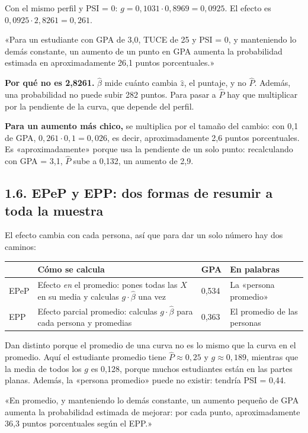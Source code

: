 \documentclass[11pt,letterpaper]{article}
\newcommand{\tema}[1]{\subsection*{#1}}
\newcommand{\Ph}{\hat{P}}
\newcommand{\zh}{\hat{z}}
\begin{document}
Con el mismo perfil y PSI = 0: $g=0{,}1031\cdot0{,}8969=0{,}0925$. El efecto es $0{,}0925\cdot2{,}8261=0{,}261$.

\begin{frase}
«Para un estudiante con GPA de 3,0, TUCE de 25 y PSI = 0, y manteniendo lo demás constante, un aumento de un punto en GPA aumenta la probabilidad estimada en aproximadamente 26,1 puntos porcentuales.»
\end{frase}

\textbf{Por qué no es 2,8261.} $\hat\beta$ mide cuánto cambia $\zh$, el puntaje, y no $\Ph$. Además, una probabilidad no puede subir 282 puntos. Para pasar a $\Ph$ hay que multiplicar por la pendiente de la curva, que depende del perfil.

\textbf{Para un aumento más chico,} se multiplica por el tamaño del cambio: con 0,1 de GPA, $0{,}261\cdot0{,}1=0{,}026$, es decir, aproximadamente 2,6 puntos porcentuales. Es «aproximadamente» porque usa la pendiente de un solo punto: recalculando con GPA = 3,1, $\Ph$ sube a 0,132, un aumento de 2,9.

\tema{1.6. EPeP y EPP: dos formas de resumir a toda la muestra}

El efecto cambia con cada persona, así que para dar un solo número hay dos caminos:

\begin{center}
\begin{tabular}{p{1.1cm}p{6.4cm}p{2.4cm}p{3.5cm}}
\toprule
& \textbf{Cómo se calcula} & \textbf{GPA} & \textbf{En palabras} \\
\midrule
EPeP & Efecto \emph{en} el promedio: pones todas las $X$ en su media y calculas $g\cdot\hat\beta$ una vez & 0,534 & La «persona promedio» \\
EPP & Efecto parcial promedio: calculas $g\cdot\hat\beta$ para cada persona y promedias & 0,363 & El promedio de las personas \\
\bottomrule
\end{tabular}
\end{center}

Dan distinto porque el promedio de una curva no es lo mismo que la curva en el promedio. Aquí el estudiante promedio tiene $\Ph\approx0{,}25$ y $g\approx0{,}189$, mientras que la media de todos los $g$ es 0,128, porque muchos estudiantes están en las partes planas. Además, la «persona promedio» puede no existir: tendría PSI = 0,44.

\begin{frase}
«En promedio, y manteniendo lo demás constante, un aumento pequeño de GPA aumenta la probabilidad estimada de mejorar: por cada punto, aproximadamente 36,3 puntos porcentuales según el EPP.»
\end{frase}
\end{document}
